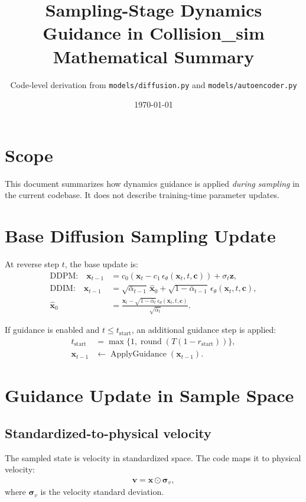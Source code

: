 \documentclass[11pt,a4paper]{article}
\title{Sampling-Stage Dynamics Guidance in Collision\_sim\\Mathematical Summary}
\author{Code-level derivation from \texttt{models/diffusion.py} and \texttt{models/autoencoder.py}}
\date{\today}
\begin{document}
\maketitle

\section{Scope}
This document summarizes how dynamics guidance is applied \emph{during sampling} in the current codebase.
It does not describe training-time parameter updates.

\section{Base Diffusion Sampling Update}
At reverse step $t$, the base update is:
\begin{align}
\text{DDPM:}\quad
\bm{x}_{t-1}
&=
c_0 \left(\bm{x}_t - c_1\,\epsilon_\theta(\bm{x}_t,t,\bm{c})\right)
 + \sigma_t \bm{z},
\\
\text{DDIM:}\quad
\bm{x}_{t-1}
&=
\sqrt{\bar{\alpha}_{t-1}}\,\hat{\bm{x}}_0
 + \sqrt{1-\bar{\alpha}_{t-1}}\,\epsilon_\theta(\bm{x}_t,t,\bm{c}),
\\
\hat{\bm{x}}_0
&=
\frac{\bm{x}_t-\sqrt{1-\bar{\alpha}_t}\,\epsilon_\theta(\bm{x}_t,t,\bm{c})}
{\sqrt{\bar{\alpha}_t}}.
\end{align}

If guidance is enabled and $t \le t_{\text{start}}$, an additional guidance step is applied:
\begin{align}
t_{\text{start}} &= \max\{1,\operatorname{round}(T(1-r_{\text{start}}))\},
\\
\bm{x}_{t-1} &\leftarrow \operatorname{ApplyGuidance}(\bm{x}_{t-1}).
\end{align}

\section{Guidance Update in Sample Space}
\subsection{Standardized-to-physical velocity}
The sampled state is velocity in standardized space. The code maps it to physical velocity:
\begin{align}
\bm{v} = \bm{x}\odot \bm{\sigma}_v,
\end{align}
where $\bm{\sigma}_v$ is the velocity standard deviation.
\end{document}
